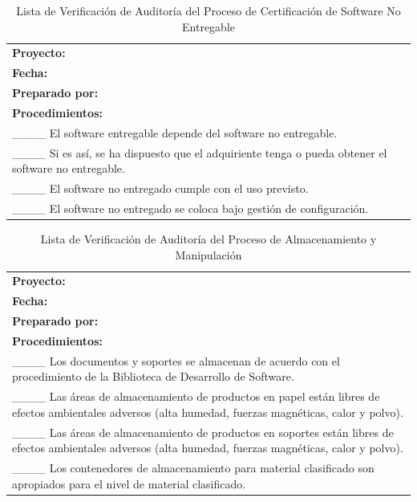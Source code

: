 \begin{table}[H]
\centering
\caption{Lista de Verificación de Auditoría del Proceso de Certificación de Software No Entregable}
\label{fig:b13}
\begin{tabular}{|p{14cm}|}
\hline
\textbf{Proyecto:} \\
\textbf{Fecha:} \\
\textbf{Preparado por:} \\
\hline
\textbf{Procedimientos:} \\
\_\_\_\_ El software entregable depende del software no entregable. \\
\_\_\_\_ Si es así, se ha dispuesto que el adquiriente tenga o pueda obtener el software no entregable. \\
\_\_\_\_ El software no entregado cumple con el uso previsto. \\
\_\_\_\_ El software no entregado se coloca bajo gestión de configuración. \\
\hline
\end{tabular}
\end{table}

\begin{table}[H]
\centering
\caption{Lista de Verificación de Auditoría del Proceso de Almacenamiento y Manipulación}
\label{fig:b14}
\begin{tabular}{|p{14cm}|}
\hline
\textbf{Proyecto:} \\
\textbf{Fecha:} \\
\textbf{Preparado por:} \\
\hline
\textbf{Procedimientos:} \\
\_\_\_\_ Los documentos y soportes se almacenan de acuerdo con el procedimiento de la Biblioteca de Desarrollo de Software. \\
\_\_\_\_ Las áreas de almacenamiento de productos en papel están libres de efectos ambientales adversos (alta humedad, fuerzas magnéticas, calor y polvo). \\
\_\_\_\_ Las áreas de almacenamiento de productos en soportes están libres de efectos ambientales adversos (alta humedad, fuerzas magnéticas, calor y polvo). \\
\_\_\_\_ Los contenedores de almacenamiento para material clasificado son apropiados para el nivel de material clasificado. \\
\hline
\end{tabular}
\end{table}

